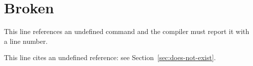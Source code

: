 \documentclass[11pt]{article}
\begin{document}
\section{Broken}\label{sec:broken}

This line references an undefined command \thisCommandDoesNotExist and the
compiler must report it with a line number.

This line cites an undefined reference: see Section~\ref{sec:does-not-exist}.
\end{document}
